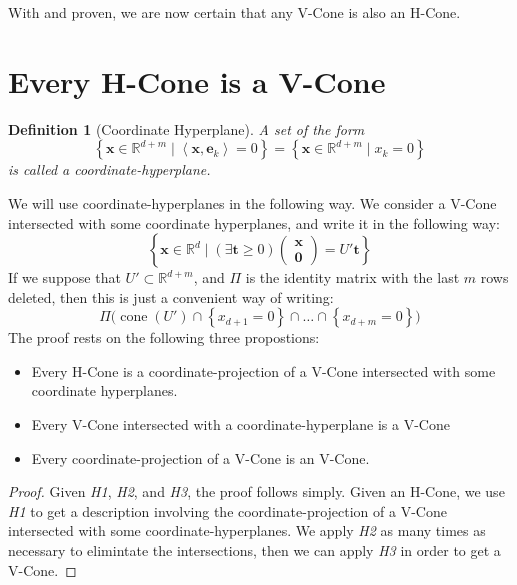 \documentclass[fleqn]{article}
\renewcommand{\vec}[1]{\mathbf{#1}}
\newcommand{\set}[1]{\left\{#1\right\}}
\DeclareMathOperator{\cone}{cone}
\newcommand{\ip}[2]{\left\langle #1, #2 \right\rangle}
\newcommand{\R}{\mathbb{R}}
\newcommand{\0}{\vec{0}}
\newcommand{\x}{\vec{x}}
\newcommand{\e}{\vec{e}}
\renewcommand{\t}{\vec{t}}
\newcommand{\st}{\;|\;}
\newcommand{\St}{\;\Big|\;}
\newcommand{\Adim}{m}
\newcommand{\xv}{\x \in \R^d}
\newcommand{\xz}{\begin{pmatrix*}\x\\ \0\end{pmatrix*}}
\newtheorem{Def}{Definition}
\begin{document}
With {\Vcomp} and {\Vproj} proven, we are now certain that any V-Cone is also an H-Cone.

\section{Every H-Cone is a V-Cone}

\begin{Def}[Coordinate Hyperplane]{
  A set of the form
  \[ \set{\x \in \R^{d+\Adim} \st \ip{\x}{\e_k} = 0} = 
     \set{\x \in \R^{d+\Adim} \st x_k = 0}
  \]
  is called a \em{coordinate-hyperplane}.
}\end{Def}

We will use coordinate-hyperplanes in the following way.  We consider a V-Cone intersected with some coordinate hyperplanes, and write it in the following way:
\begin{equation}\label{eq:coneintform1}
   \set{\xv \St (\exists \t \geq 0) \xz = U'\t}
\end{equation}
If we suppose that $U' \subset \R^{d+\Adim}$, and $\Pi$ is the identity matrix with the last $\Adim$ rows deleted, then this is just a convenient way of writing:
\begin{equation}\label{eq:coneintform2}
  \Pi\big(\cone(U') \cap \set{x_{d+1} = 0} 
                        \cap \dots \cap \set{x_{d+\Adim} = 0}\big)
\end{equation}
\newcommand{\Hlift}{\textit{H1}}
\newcommand{\Hint}{\textit{H2}}
\newcommand{\Hproj}{\textit{H3}}
  The proof rests on the following three propostions:
  \begin{itemize}
  \item[\Hlift] Every H-Cone is a coordinate-projection of a V-Cone intersected with some coordinate hyperplanes.
  \item[\Hint] Every V-Cone intersected with a coordinate-hyperplane is a V-Cone
  \item[\Hproj] Every coordinate-projection of a V-Cone is an V-Cone.
  \end{itemize}
\begin{proof}
  Given {\Hlift}, {\Hint}, and {\Hproj}, the proof follows simply.  Given an H-Cone, we use {\Hlift} to get a description involving the coordinate-projection of a V-Cone intersected with some coordinate-hyperplanes.  We apply {\Hint} as many times as necessary to elimintate the intersections, then we can apply {\Hproj} in order to get a V-Cone.
\end{proof}
\end{document}
